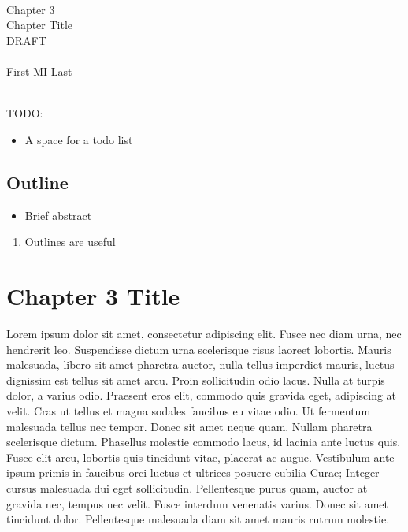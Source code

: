 \documentclass[draftthesis,fullpage,offcenter]{uiucthesis2009}
\begin{document}
		
	\setcounter{chapter}{2}
	\mainmatter
	
	\begin{center}
	~\\~\\~\\
		{\Large Chapter 3\\}
		{\LARGE Chapter Title\\}
		{\Huge DRAFT\\}~\\
		{\Large First MI Last\\}
	\end{center}
	~\\
	{\Large TODO:}
	\begin{itemize}
		\item A space for a todo list
	\end{itemize}

	\thispagestyle{empty}
	\newpage
	
	\section*{Outline}
	
	\begin{itemize}
		\item Brief abstract
	\end{itemize}
	\begin{enumerate}
		\item Outlines are useful
	\end{enumerate}
	
	\thispagestyle{empty}
	\setcounter{page}{\pageref{ch2:end}}
	\newpage
\else
\fi
	
\graphicspath{{./fig_ch3/}}


\chapter{Chapter 3 Title}\label{ch:chapter3_label}

Lorem ipsum dolor sit amet, consectetur adipiscing elit. Fusce nec diam urna, 
nec hendrerit leo. Suspendisse dictum urna scelerisque risus laoreet lobortis. 
Mauris malesuada, libero sit amet pharetra auctor, nulla tellus imperdiet 
mauris, luctus dignissim est tellus sit amet arcu. Proin sollicitudin odio 
lacus. Nulla at turpis dolor, a varius odio. Praesent eros elit, commodo quis 
gravida eget, adipiscing at velit. Cras ut tellus et magna sodales faucibus eu 
vitae odio. Ut fermentum malesuada tellus nec tempor. Donec sit amet neque quam. 
Nullam pharetra scelerisque dictum. Phasellus molestie commodo lacus, id lacinia 
ante luctus quis. Fusce elit arcu, lobortis quis tincidunt vitae, placerat ac 
augue. Vestibulum ante ipsum primis in faucibus orci luctus et ultrices posuere 
cubilia Curae; Integer cursus malesuada dui eget sollicitudin. Pellentesque 
purus quam, auctor at gravida nec, tempus nec velit. Fusce interdum venenatis 
varius. Donec sit amet tincidunt dolor. Pellentesque malesuada diam sit amet 
mauris rutrum molestie.
\end{document}
